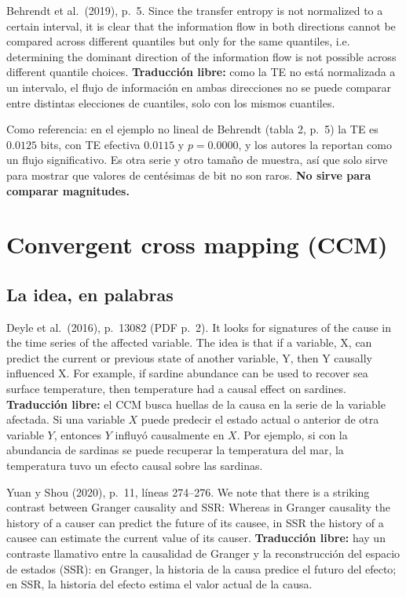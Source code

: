 \documentclass[11pt,openany]{book}
\begin{document}
\begin{cita}{Behrendt et al.\ (2019), p.~5.}
Since the transfer entropy is not normalized to a certain interval, it is clear that the information flow in both directions cannot be compared across different quantiles but only for the same quantiles, i.e. determining the dominant direction of the information flow is not possible across different quantile choices.
\tcblower
\textbf{Traducción libre:} como la TE no está normalizada a un intervalo, el flujo de información en ambas direcciones no se puede comparar entre distintas elecciones de cuantiles, solo con los mismos cuantiles.
\end{cita}

Como referencia: en el ejemplo no lineal de Behrendt (tabla 2, p.~5) la TE es $0.0125$ bits, con TE efectiva $0.0115$ y $p = 0.0000$, y los autores la reportan como un flujo significativo. Es otra serie y otro tamaño de muestra, así que solo sirve para mostrar que valores de centésimas de bit no son raros. \textbf{No sirve para comparar magnitudes.}

\chapter{Convergent cross mapping (CCM)}\label{cap:ccm}

\section{La idea, en palabras}

\begin{cita}{Deyle et al.\ (2016), p.~13082 (PDF p.~2).}
It looks for signatures of the cause in the time series of the affected variable. The idea is that if a variable, X, can predict the current or previous state of another variable, Y, then Y causally influenced X. For example, if sardine abundance can be used to recover sea surface temperature, then temperature had a causal effect on sardines.
\tcblower
\textbf{Traducción libre:} el CCM busca huellas de la causa en la serie de la variable afectada. Si una variable $X$ puede predecir el estado actual o anterior de otra variable $Y$, entonces $Y$ influyó causalmente en $X$. Por ejemplo, si con la abundancia de sardinas se puede recuperar la temperatura del mar, la temperatura tuvo un efecto causal sobre las sardinas.
\end{cita}

\begin{cita}{Yuan y Shou (2020), p.~11, líneas 274--276.}
We note that there is a striking contrast between Granger causality and SSR: Whereas in Granger causality the history of a causer can predict the future of its causee, in SSR the history of a causee can estimate the current value of its causer.
\tcblower
\textbf{Traducción libre:} hay un contraste llamativo entre la causalidad de Granger y la reconstrucción del espacio de estados (SSR): en Granger, la historia de la causa predice el futuro del efecto; en SSR, la historia del efecto estima el valor actual de la causa.
\end{cita}
\end{document}
